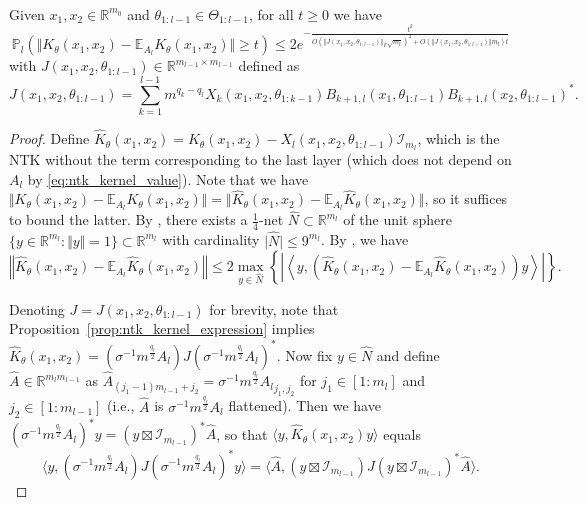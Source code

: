 \documentclass[twoside,11pt]{article}
\newcommand{\R}{\mathbb{R}}
\newcommand{\E}{\mathbb{E}}
\newcommand{\Prob}{\mathbb{P}}
\newcommand{\Id}{\mathcal{I}}
\begin{document}
\begin{proposition} \label{prop:readout_concentration}~\\
Given $x_1, x_2 \in \R^{m_0}$ and $\theta_{1:l-1} \in \Theta_{1:l-1}$, for all $t \geq 0$ we have
\[
\Prob_l\left( \Vert K_\theta(x_1,x_2) - \E_{A_l} K_\theta(x_1,x_2) \Vert \geq t \right)
\leq 2e^{-\frac{t^2}{O\left( \Vert J(x_1,x_2,\theta_{1 : l-1}) \Vert_F \sqrt{m_l} \right)^2 + O\left( \Vert J(x_1,x_2,\theta_{1 : l-1}) \Vert m_l \right) t}}
\]
with $J(x_1,x_2,\theta_{1 : l-1}) \in \R^{m_{l-1} \times m_{l-1}}$ defined as
\[
J(x_1,x_2,\theta_{1 : l-1})
= \sum_{k=1}^{l-1} m^{q_k-q_l} X_k(x_1,x_2,\theta_{1:k-1}) B_{k+1, l}(x_1, \theta_{1 : l-1}) B_{k+1, l}(x_2, \theta_{1 : l-1})^*.
\]
\end{proposition}
\begin{proof}
Define $\hat{K}_\theta(x_1,x_2) = K_\theta(x_1,x_2) - X_l(x_1,x_2,\theta_{1:l-1}) \Id_{m_l}$, which is the NTK without the term corresponding to the last layer (which does not depend on $A_l$ by \eqref{eq:ntk_kernel_value}). Note that we have $\Vert K_\theta(x_1,x_2) - \E_{A_l} K_\theta(x_1,x_2) \Vert = \Vert \hat{K}_\theta(x_1,x_2) - \E_{A_l} \hat{K}_\theta(x_1,x_2) \Vert$, so it suffices to bound the latter. By \citet[Corollary~4.2.13]{Vershynin2018}, there exists a $\frac{1}{4}$-net $\hat{N} \subset \R^{m_l}$ of the unit sphere $\{ y \in \R^{m_l} : \Vert y \Vert = 1 \} \subset \R^{m_l}$ with cardinality $\vert \hat{N} \vert \leq 9^{m_l}$. By \citet[Exercise~4.4.3(b)]{Vershynin2018}, we have
\[
\left\Vert \hat{K}_\theta(x_1,x_2) - \E_{A_l} \hat{K}_\theta(x_1,x_2) \right\Vert 
\leq 2 \max_{y \in \hat{N}}\left\{ \left\vert \left\langle y, \left( \hat{K}_\theta(x_1,x_2) - \E_{A_l} \hat{K}_\theta(x_1,x_2) \right) y \right\rangle \right\vert \right\}.
\]

Denoting $J = J(x_1,x_2,\theta_{1 : l-1})$ for brevity, note that Proposition~\ref{prop:ntk_kernel_expression} implies $\hat{K}_\theta(x_1,x_2) = (\sigma^{-1} m^{\frac{q_l}{2}} A_l) J (\sigma^{-1} m^{\frac{q_l}{2}} A_l)^*$. Now fix $y \in \hat{N}$ and define $\hat{A} \in \R^{m_l m_{l-1}}$ as $\hat{A}_{(j_1-1) m_{l-1} + j_2} = \sigma^{-1} m^{\frac{q_l}{2}} {A_l}_{j_1,j_2}$ for $j_1 \in [1:m_l]$ and $j_2 \in [1:m_{l-1}]$ (i.e., $\hat{A}$ is $\sigma^{-1} m^{\frac{q_l}{2}} A_l$ flattened). Then we have $(\sigma^{-1} m^{\frac{q_l}{2}} A_l)^* y = (y \boxtimes \Id_{m_{l-1}})^* \hat{A}$, so that $\langle y, \hat{K}_\theta(x_1,x_2) y \rangle$ equals
\[
\langle y , (\sigma^{-1} m^{\frac{q_l}{2}} A_l) J (\sigma^{-1} m^{\frac{q_l}{2}} A_l)^*y \rangle
= \langle \hat{A}, (y \boxtimes \Id_{m_{l-1}} ) J (y \boxtimes \Id_{m_{l-1}} )^* \hat{A} \rangle.
\]


\end{proof}
\end{document}
